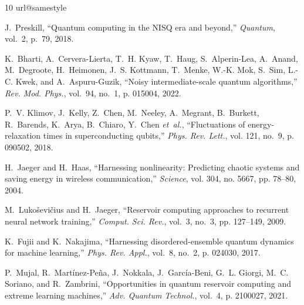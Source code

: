 \documentclass[journal]{IEEEtran}
\begin{document}
\begin{thebibliography}{10}
\providecommand{\url}[1]{#1}
\csname url@samestyle\endcsname
\providecommand{\newblock}{\relax}
\providecommand{\bibinfo}[2]{#2}
\providecommand{\BIBentrySTDinterwordspacing}{\spaceskip=0pt\relax}
\providecommand{\BIBentryALTinterwordstretchfactor}{4}
\providecommand{\BIBentryALTinterwordspacing}{\spaceskip=\fontdimen2\font plus
\BIBentryALTinterwordstretchfactor\fontdimen3\font minus
  \fontdimen4\font\relax}
\providecommand{\BIBforeignlanguage}[2]{{%
\expandafter\ifx\csname l@#1\endcsname\relax
\typeout{** WARNING: IEEEtran.bst: No hyphenation pattern has been}%
\typeout{** loaded for the language `#1'. Using the pattern for}%
\typeout{** the default language instead.}%
\else
\language=\csname l@#1\endcsname
\fi
#2}}
\providecommand{\BIBdecl}{\relax}
\BIBdecl

J.~Preskill, ``Quantum computing in the {NISQ} era and beyond,''
  \emph{Quantum}, vol.~2, p.~79, 2018.

K.~Bharti, A.~Cervera-Lierta, T.~H. Kyaw, T.~Haug, S.~Alperin-Lea, A.~Anand,
  M.~Degroote, H.~Heimonen, J.~S. Kottmann, T.~Menke, W.-K. Mok, S.~Sim, L.-C.
  Kwek, and A.~Aspuru-Guzik, ``Noisy intermediate-scale quantum algorithms,''
  \emph{Rev. Mod. Phys.}, vol.~94, no.~1, p. 015004, 2022.

P.~V. Klimov, J.~Kelly, Z.~Chen, M.~Neeley, A.~Megrant, B.~Burkett, R.~Barends,
  K.~Arya, B.~Chiaro, Y.~Chen \emph{et~al.}, ``Fluctuations of
  energy-relaxation times in superconducting qubits,'' \emph{Phys. Rev. Lett.},
  vol. 121, no.~9, p. 090502, 2018.

H.~Jaeger and H.~Haas, ``Harnessing nonlinearity: Predicting chaotic systems
  and saving energy in wireless communication,'' \emph{Science}, vol. 304, no.
  5667, pp. 78--80, 2004.

M.~Luko{\v{s}}evi{\v{c}}ius and H.~Jaeger, ``Reservoir computing approaches to
  recurrent neural network training,'' \emph{Comput. Sci. Rev.}, vol.~3, no.~3,
  pp. 127--149, 2009.

K.~Fujii and K.~Nakajima, ``Harnessing disordered-ensemble quantum dynamics for
  machine learning,'' \emph{Phys. Rev. Appl.}, vol.~8, no.~2, p. 024030, 2017.

P.~Mujal, R.~Mart{\'i}nez-Pe{\~n}a, J.~Nokkala, J.~Garc{\'i}a-Beni, G.~L.
  Giorgi, M.~C. Soriano, and R.~Zambrini, ``Opportunities in quantum reservoir
  computing and extreme learning machines,'' \emph{Adv. Quantum Technol.},
  vol.~4, p. 2100027, 2021.


\end{thebibliography}
\end{document}
